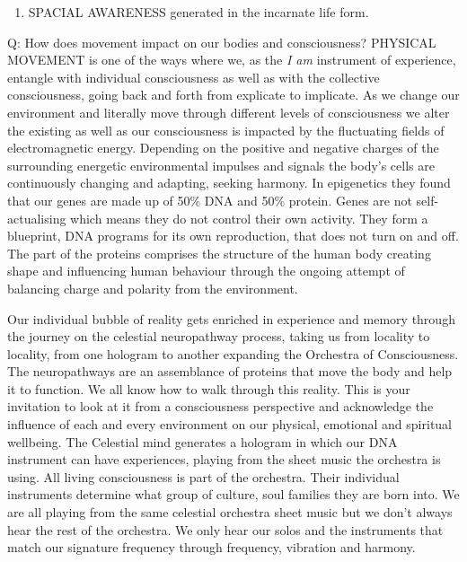 \begin{enumerate}
\def\labelenumi{\arabic{enumi}.}
\tightlist
\item
  SPACIAL AWARENESS generated in the incarnate life form.
\end{enumerate}

Q: How does movement impact on our bodies and consciousness? PHYSICAL
MOVEMENT is one of the ways where we, as the \emph{I am} instrument of
experience, entangle with individual consciousness as well as with the
collective consciousness, going back and forth from explicate to
implicate. As we change our environment and literally move through
different levels of consciousness we alter the existing as well as our
consciousness is impacted by the fluctuating fields of electromagnetic
energy. Depending on the positive and negative charges of the
surrounding energetic environmental impulses and signals the body's
cells are continuously changing and adapting, seeking harmony. In
epigenetics they found that our genes are made up of 50\% DNA and 50\%
protein. Genes are not self-actualising which means they do not control
their own activity. They form a blueprint, DNA programs for its own
reproduction, that does not turn on and off. The part of the proteins
comprises the structure of the human body creating shape and influencing
human behaviour through the ongoing attempt of balancing charge and
polarity from the environment.

Our individual bubble of reality gets enriched in experience and memory
through the journey on the celestial neuropathway process, taking us
from locality to locality, from one hologram to another expanding the
Orchestra of Consciousness. The neuropathways are an assemblance of
proteins that move the body and help it to function. We all know how to
walk through this reality. This is your invitation to look at it from a
consciousness perspective and acknowledge the influence of each and
every environment on our physical, emotional and spiritual wellbeing.
The Celestial mind generates a hologram in which our DNA instrument can
have experiences, playing from the sheet music the orchestra is using.
All living consciousness is part of the orchestra. Their individual
instruments determine what group of culture, soul families they are born
into. We are all playing from the same celestial orchestra sheet music
but we don't always hear the rest of the orchestra. We only hear our
solos and the instruments that match our signature frequency through
frequency, vibration and harmony.

